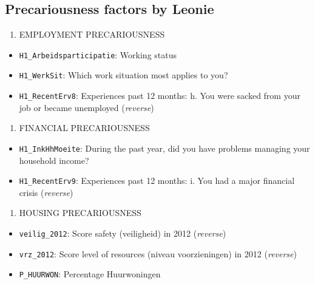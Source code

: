 \documentclass[
]{article}
\providecommand{\tightlist}{%
  \setlength{\itemsep}{0pt}\setlength{\parskip}{0pt}}\usepackage{longtable,booktabs,array}
\begin{document}
\subsection{Precariousness factors by
Leonie}\label{precariousness-factors-by-leonie}

\begin{enumerate}
\def\labelenumi{\arabic{enumi}.}
\tightlist
\item
  EMPLOYMENT PRECARIOUSNESS
\end{enumerate}

\begin{itemize}
\tightlist
\item
  \texttt{H1\_Arbeidsparticipatie}: Working status
\item
  \texttt{H1\_WerkSit}: Which work situation most applies to you?
\item
  \texttt{H1\_RecentErv8}: Experiences past 12 months: h. You were
  sacked from your job or became unemployed (\emph{reverse})
\end{itemize}

\begin{enumerate}
\def\labelenumi{\arabic{enumi}.}
\setcounter{enumi}{1}
\tightlist
\item
  FINANCIAL PRECARIOUSNESS
\end{enumerate}

\begin{itemize}
\tightlist
\item
  \texttt{H1\_InkHhMoeite}: During the past year, did you have problems
  managing your household income?
\item
  \texttt{H1\_RecentErv9}: Experiences past 12 months: i. You had a
  major financial crisis (\emph{reverse})
\end{itemize}

\begin{enumerate}
\def\labelenumi{\arabic{enumi}.}
\setcounter{enumi}{2}
\tightlist
\item
  HOUSING PRECARIOUSNESS
\end{enumerate}

\begin{itemize}
\tightlist
\item
  \texttt{veilig\_2012}: Score safety (veiligheid) in 2012
  (\emph{reverse})
\item
  \texttt{vrz\_2012}: Score level of resources (niveau voorzieningen) in
  2012 (\emph{reverse})
\item
  \texttt{P\_HUURWON}: Percentage Huurwoningen
\end{itemize}
\end{document}
